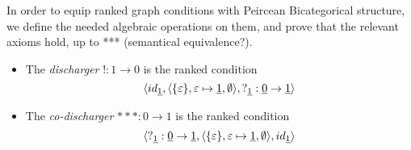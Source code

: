 In order to equip ranked graph conditions with Peircean Bicategorical structure, we define the needed algebraic operations on them, and prove that the relevant axioms hold, up to *** (semantical equivalence?).

\begin{definition}

  \begin{itemize}
    \item The \emph{discharger} $!: 1 \to 0$ is the ranked condition 
    $$\langle id_{\underline{1}}, \langle \{\varepsilon\}, \varepsilon\mapsto \underline{1}, \emptyset\rangle, ?_{\underline{1}}:
   \underline{0} \to \underline{1}\rangle$$  
   \item The \emph{co-discharger} $***: 0 \to 1$ is the ranked condition 
   $$\langle ?_{\underline{1}}:
   \underline{0} \to \underline{1}, \langle \{\varepsilon\}, \varepsilon\mapsto \underline{1}, \emptyset\rangle, id_{\underline{1}}\rangle$$

\end{itemize}
\end{definition}
